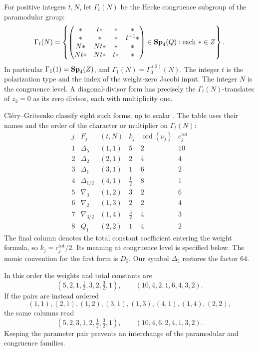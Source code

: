 For positive integers \(t,N\), let \(\Gamma_t(N)\) be the
Hecke congruence subgroup of the paramodular group:
\[
 \Gamma_t(N)=
 \left\{
 \begin{pmatrix}
 *&t*&*&*\\
 *&*&*&t^{-1}*\\
 N*&Nt*&*&*\\
 Nt*&Nt*&t*&*
 \end{pmatrix}\in\mathbf{Sp}_4(Q):\text{each }*\in Z
 \right\}.
\]
In particular \(\Gamma_1(1)=\mathbf{Sp}_4(Z)\), and
\(\Gamma_1(N)=\Gamma_0^{(2)}(N)\).
The integer \(t\) is the polarization type and the index of the
weight-zero Jacobi input.
The integer \(N\) is the congruence level.
A diagonal-divisor form has precisely the
\(\Gamma_t(N)\)-translates of \(z_2=0\) as its zero divisor,
each with multiplicity one.

Cl\'ery--Gritsenko classify eight such forms, up to scalar
\cite[Theorem 1.4]{GC}.
The table uses their names and the order of the character or
multiplier on \(\Gamma_t(N)\):
\[
\begin{array}{c|c|c|c|c|c}
 j&F_j&(t,N)&k_j&\operatorname{ord}(\nu_j)&c_j^{\mathrm{tot}}\\ \hline
 1&\Delta_5&(1,1)&5&2&10\\
 2&\Delta_2&(2,1)&2&4&4\\
 3&\Delta_1&(3,1)&1&6&2\\
 4&\Delta_{1/2}&(4,1)&\tfrac12&8&1\\
 5&\nabla_3&(1,2)&3&2&6\\
 6&\nabla_2&(1,3)&2&2&4\\
 7&\nabla_{3/2}&(1,4)&\tfrac32&4&3\\
 8&Q_1&(2,2)&1&4&2
\end{array}
\]
The final column denotes the total constant coefficient entering
the weight formula, so \(k_j=c_j^{\mathrm{tot}}/2\).
Its meaning at congruence level is specified below.
The monic convention for the first form is \(D_5\).
Our symbol \(\Delta_5\) restores the factor \(64\).

In this order the weights and total constants are
\[
 (5,2,1,\tfrac12,3,2,\tfrac32,1),\qquad
 (10,4,2,1,6,4,3,2).
\]
If the pairs are instead ordered
\[
 (1,1),(2,1),(1,2),(3,1),(1,3),(4,1),(1,4),(2,2),
\]
the same columns read
\[
 (5,2,3,1,2,\tfrac12,\tfrac32,1),\qquad
 (10,4,6,2,4,1,3,2).
\]
Keeping the parameter pair prevents an interchange of the
paramodular and congruence families.

